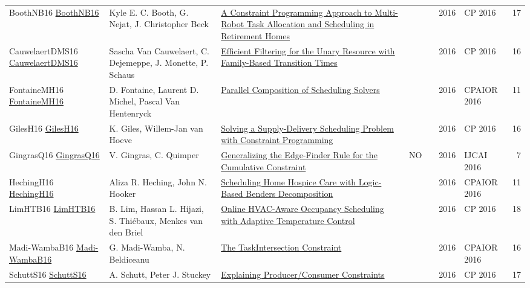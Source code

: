 {\begin{longtable}{p{3cm}p{6cm}p{7cm}rrrp{3cm}r}
BoothNB16 \href{https://doi.org/10.1007/978-3-319-44953-1\_34}{BoothNB16} & Kyle E. C. Booth, G. Nejat, J. Christopher Beck & \href{papers/BoothNB16.pdf}{A Constraint Programming Approach to Multi-Robot Task Allocation and Scheduling in Retirement Homes} &  & \cite{BoothNB16} & 2016 & CP 2016 & 17\\
CauwelaertDMS16 \href{https://doi.org/10.1007/978-3-319-44953-1\_33}{CauwelaertDMS16} & Sascha Van Cauwelaert, C. Dejemeppe, J. Monette, P. Schaus & \href{papers/CauwelaertDMS16.pdf}{Efficient Filtering for the Unary Resource with Family-Based Transition Times} &  & \cite{CauwelaertDMS16} & 2016 & CP 2016 & 16\\
FontaineMH16 \href{https://doi.org/10.1007/978-3-319-33954-2\_12}{FontaineMH16} & D. Fontaine, Laurent D. Michel, Pascal Van Hentenryck & \href{papers/FontaineMH16.pdf}{Parallel Composition of Scheduling Solvers} &  & \cite{FontaineMH16} & 2016 & CPAIOR 2016 & 11\\
GilesH16 \href{https://doi.org/10.1007/978-3-319-44953-1\_38}{GilesH16} & K. Giles, Willem{-}Jan van Hoeve & \href{papers/GilesH16.pdf}{Solving a Supply-Delivery Scheduling Problem with Constraint Programming} &  & \cite{GilesH16} & 2016 & CP 2016 & 16\\
GingrasQ16 \href{http://www.ijcai.org/Abstract/16/440}{GingrasQ16} & V. Gingras, C. Quimper & \href{papers/GingrasQ16.pdf}{Generalizing the Edge-Finder Rule for the Cumulative Constraint} & NO & \cite{GingrasQ16} & 2016 & IJCAI 2016 & 7\\
HechingH16 \href{https://doi.org/10.1007/978-3-319-33954-2\_14}{HechingH16} & Aliza R. Heching, John N. Hooker & \href{papers/HechingH16.pdf}{Scheduling Home Hospice Care with Logic-Based Benders Decomposition} &  & \cite{HechingH16} & 2016 & CPAIOR 2016 & 11\\
LimHTB16 \href{https://doi.org/10.1007/978-3-319-44953-1\_43}{LimHTB16} & B. Lim, Hassan L. Hijazi, S. Thi{\'{e}}baux, Menkes van den Briel & \href{papers/LimHTB16.pdf}{Online HVAC-Aware Occupancy Scheduling with Adaptive Temperature Control} &  & \cite{LimHTB16} & 2016 & CP 2016 & 18\\
Madi-WambaB16 \href{https://doi.org/10.1007/978-3-319-33954-2\_18}{Madi-WambaB16} & G. Madi{-}Wamba, N. Beldiceanu & \href{papers/Madi-WambaB16.pdf}{The TaskIntersection Constraint} &  & \cite{Madi-WambaB16} & 2016 & CPAIOR 2016 & 16\\
SchuttS16 \href{https://doi.org/10.1007/978-3-319-44953-1\_28}{SchuttS16} & A. Schutt, Peter J. Stuckey & \href{papers/SchuttS16.pdf}{Explaining Producer/Consumer Constraints} &  & \cite{SchuttS16} & 2016 & CP 2016 & 17\\

\end{longtable}}
